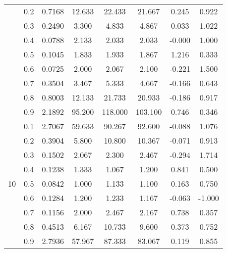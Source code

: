 \documentclass[11pt,a4paper]{report}
\begin{document}
\begin{longtable}{ | c | c || c | c | c | c | c | c | }
 & 0.2 & 0.7168 & 12.633 & 22.433 & 21.667 & 0.245 & 0.922 \\
 & 0.3 & 0.2490 & 3.300 & 4.833 & 4.867 & 0.033 & 1.022 \\
 & 0.4 & 0.0788 & 2.133 & 2.033 & 2.033 & -0.000 & 1.000 \\
 & 0.5 & 0.1045 & 1.833 & 1.933 & 1.867 & 1.216 & 0.333 \\
 & 0.6 & 0.0725 & 2.000 & 2.067 & 2.100 & -0.221 & 1.500 \\
 & 0.7 & 0.3504 & 3.467 & 5.333 & 4.667 & -0.166 & 0.643 \\
 & 0.8 & 0.8003 & 12.133 & 21.733 & 20.933 & -0.186 & 0.917 \\
 & 0.9 & 2.1892 & 95.200 & 118.000 & 103.100 & 0.746 & 0.346 \\
 \hline
\multirow{9}{*}{10} & 0.1 & 2.7067 & 59.633 & 90.267 & 92.600 & -0.088 & 1.076 \\
 & 0.2 & 0.3904 & 5.800 & 10.800 & 10.367 & -0.071 & 0.913 \\
 & 0.3 & 0.1502 & 2.067 & 2.300 & 2.467 & -0.294 & 1.714 \\
 & 0.4 & 0.1238 & 1.333 & 1.067 & 1.200 & 0.841 & 0.500 \\
 & 0.5 & 0.0842 & 1.000 & 1.133 & 1.100 & 0.163 & 0.750 \\
 & 0.6 & 0.1284 & 1.200 & 1.233 & 1.167 & -0.063 & -1.000 \\
 & 0.7 & 0.1156 & 2.000 & 2.467 & 2.167 & 0.738 & 0.357 \\
 & 0.8 & 0.4513 & 6.167 & 10.733 & 9.600 & 0.373 & 0.752 \\
 & 0.9 & 2.7936 & 57.967 & 87.333 & 83.067 & 0.119 & 0.855 \\
 \hline
\hline
\end{longtable}
\end{document}
